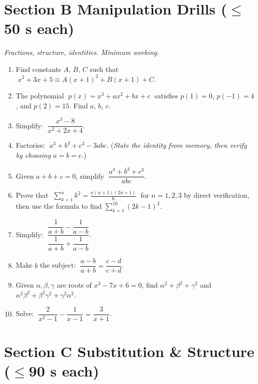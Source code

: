 \documentclass[11pt,a4paper]{article}
\begin{document}
\section*{Section B \quad Manipulation Drills \hfill{\normalfont\small($\leq$50 s each)}}

\noindent\textit{Fractions, structure, identities. Minimum working.}

\begin{enumerate}

\item Find constants $A$, $B$, $C$ such that
      $\;x^2 + 3x + 5 \equiv A(x+1)^2 + B(x+1) + C$.

\item The polynomial $\;p(x) = x^3 + ax^2 + bx + c\;$ satisfies
      $p(1) = 0$, $p(-1) = 4$, and $p(2) = 15$. Find $a$, $b$, $c$.

\item Simplify: $\;\dfrac{x^3 - 8}{x^2 + 2x + 4}$.

\item Factorise: $\;a^3 + b^3 + c^3 - 3abc$.
      (\textit{State the identity from memory, then verify by choosing $a=b=c$.})

\item Given $a + b + c = 0$, simplify $\;\dfrac{a^3+b^3+c^3}{abc}$.

\item Prove that $\;\displaystyle\sum_{k=1}^{n} k^2 = \frac{n(n+1)(2n+1)}{6}\;$
      for $n=1,2,3$ by direct verification, then use the formula to find
      $\displaystyle\sum_{k=1}^{10}(2k-1)^2$.

\item Simplify: $\;\dfrac{\dfrac{1}{a+b} - \dfrac{1}{a-b}}{\dfrac{1}{a+b} + \dfrac{1}{a-b}}$.

\item Make $b$ the subject: $\;\dfrac{a-b}{a+b} = \dfrac{c-d}{c+d}$.

\item Given $\alpha, \beta, \gamma$ are roots of $x^3 - 7x + 6 = 0$,
      find $\alpha^2 + \beta^2 + \gamma^2$ and $\alpha^2\beta^2 + \beta^2\gamma^2 + \gamma^2\alpha^2$.

\item Solve: $\;\dfrac{2}{x^2-1} - \dfrac{1}{x-1} = \dfrac{3}{x+1}$.

\end{enumerate}

\section*{Section C \quad Substitution \& Structure \hfill{\normalfont\small($\leq$90 s each)}}
\end{document}
